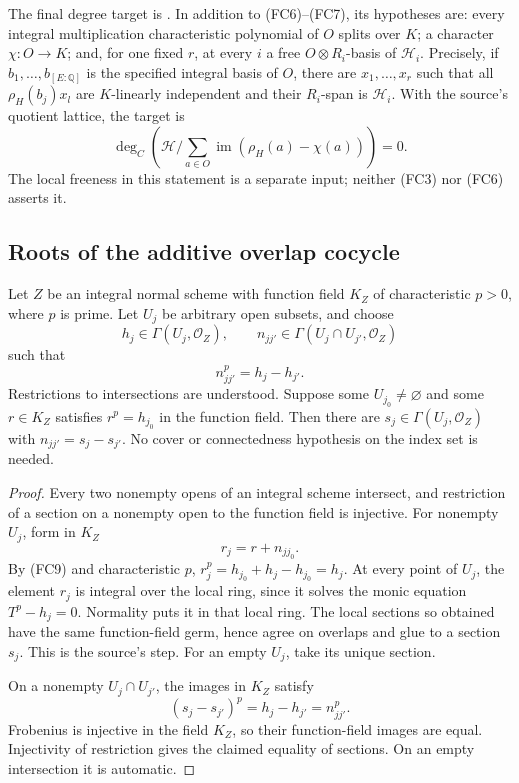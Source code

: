 The final degree target is
.
In addition to (FC6)--(FC7), its hypotheses are:
every integral multiplication characteristic polynomial
of \(O\) splits over \(K\); a character \(\chi:O\to K\);
and, for one fixed \(r\), at every \(i\) a free
\(O\otimes R_i\)-basis of \(\mathcal H_i\).
Precisely, if \(b_1,\ldots,b_{[E:\mathbb Q]}\) is the
specified integral basis of \(O\), there are \(x_1,\ldots,x_r\)
such that all \(\rho_H(b_j)x_l\) are \(K\)-linearly independent
and their \(R_i\)-span is \(\mathcal H_i\).
With the source's quotient lattice, the target is
\[
 \deg_C\!\left(
 \mathcal H\Big/
   \sum_{a\in O}\operatorname{im}(\rho_H(a)-\chi(a))
                    \right)=0.
 \tag{FC8}\label{eq:faithful-character-degree-target}
\]
The local freeness in this statement is a separate input;
neither (FC3) nor (FC6) asserts it.

\subsection{Roots of the additive overlap cocycle}
\label{subsec:faithful-cech-p-root}

\begin{srlemma}\label{lem:faithful-cech-p-root}
Let \(Z\) be an integral normal scheme with function field
\(K_Z\) of characteristic \(p>0\), where \(p\) is prime.
Let \(U_j\) be arbitrary open subsets, and choose
\[
 h_j\in\Gamma(U_j,\mathcal O_Z),\qquad
 n_{jj'}\in\Gamma(U_j\cap U_{j'},\mathcal O_Z)
\]
such that
\[
                         n_{jj'}^p=h_j-h_{j'}.
 \tag{FC9}\label{eq:faithful-p-root-overlap}
\]
Restrictions to intersections are understood.
Suppose some \(U_{j_0}\ne\varnothing\) and some
\(r\in K_Z\) satisfies \(r^p=h_{j_0}\) in the function field.
Then there are \(s_j\in\Gamma(U_j,\mathcal O_Z)\) with
\(n_{jj'}=s_j-s_{j'}\).
No cover or connectedness hypothesis on the index set
is needed.
\end{srlemma}
\begin{proof}
Every two nonempty opens of an integral scheme intersect,
and restriction of a section on a nonempty open to the
function field is injective.
For nonempty \(U_j\), form in \(K_Z\)
\[
                         r_j=r+n_{j j_0}.
\]
By (FC9) and characteristic \(p\),
\(r_j^p=h_{j_0}+h_j-h_{j_0}=h_j\).
At every point of \(U_j\), the element \(r_j\) is integral
over the local ring, since it solves the monic equation
\(T^p-h_j=0\).
Normality puts it in that local ring.
The local sections so obtained have the same function-field
germ, hence agree on overlaps and glue to a section \(s_j\).
This is the source's  step.
For an empty \(U_j\), take its unique section.

On a nonempty \(U_j\cap U_{j'}\), the images in \(K_Z\) satisfy
\[
                    (s_j-s_{j'})^p=h_j-h_{j'}=n_{jj'}^p.
\]
Frobenius is injective in the field \(K_Z\), so their
function-field images are equal.
Injectivity of restriction gives the claimed equality
of sections.  On an empty intersection it is automatic.
\end{proof}

